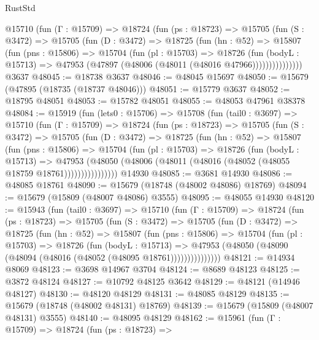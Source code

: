 \begin{lexlean}{RustStd}
\begin{coremodule}
        @15710
          (fun (Γ : @15709) =>
          @18724
            (fun (ps : @18723) =>
            @15705
              (fun (S : @3472) =>
              @15705
                (fun (D : @3472) =>
                @18725
                  (fun (hn : @52) =>
                  @15807
                    (fun (pns : @15806) =>
                    @15704
                      (fun (pl : @15703) =>
                      @18726
                        (fun (bodyL : @15713) =>
                        @47953 (@47897 (@48006 (@48011 (@48016 @47966)))))))))))))))
    @3637
@48045 := @18738 @3637
@48046 := @48045 @15697
@48050 := @15679 (@47895 (@18735 (@18737 @48046)))
@48051 := @15779 @3637
@48052 := @18795 @48051
@48053 := @15782 @48051
@48055 := @48053 @47961 @38378
@48084 := @15919
    (fun (lets0 : @15706) =>
    @15708
      (fun (tail0 : @3697) =>
      @15710
        (fun (Γ : @15709) =>
        @18724
          (fun (ps : @18723) =>
          @15705
            (fun (S : @3472) =>
            @15705
              (fun (D : @3472) =>
              @18725
                (fun (hn : @52) =>
                @15807
                  (fun (pns : @15806) =>
                  @15704
                    (fun (pl : @15703) =>
                    @18726
                      (fun (bodyL : @15713) =>
                      @47953
                        (@48050
                          (@48006 (@48011 (@48016 (@48052 (@48055 @18759 @18761))))))))))))))))
    @14930
@48085 := @3681 @14930
@48086 := @48085 @18761
@48090 := @15679 (@18748 (@48002 @48086) @18769)
@48094 := @15679 (@15809 (@48007 @48086) @3555)
@48095 := @48055 @14930
@48120 := @15943
    (fun (tail0 : @3697) =>
    @15710
      (fun (Γ : @15709) =>
      @18724
        (fun (ps : @18723) =>
        @15705
          (fun (S : @3472) =>
          @15705
            (fun (D : @3472) =>
            @18725
              (fun (hn : @52) =>
              @15807
                (fun (pns : @15806) =>
                @15704
                  (fun (pl : @15703) =>
                  @18726
                    (fun (bodyL : @15713) =>
                    @47953 (@48050 (@48090 (@48094 (@48016 (@48052 (@48095 @18761)))))))))))))))
@48121 := @14934 @8069
@48123 := @3698 @14967 @3704
@48124 := @8689 @48123
@48125 := @3872 @48124
@48127 := @10792 @48125 @3642
@48129 := @48121 (@14946 @48127)
@48130 := @48120 @48129
@48131 := @48085 @48129
@48135 := @15679 (@18748 (@48002 @48131) @18769)
@48139 := @15679 (@15809 (@48007 @48131) @3555)
@48140 := @48095 @48129
@48162 := @15961
    (fun (Γ : @15709) =>
    @18724
      (fun (ps : @18723) =>

\end{coremodule}
\end{lexlean}
